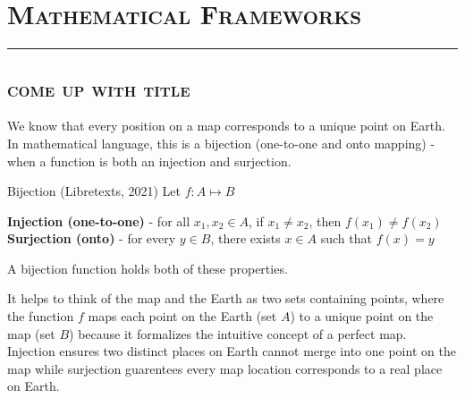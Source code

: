 \section{\textsc{Mathematical Frameworks}}
\hrule height 1pt
\vspace*{5pt}

\subsection{\textsc{come up with title}}
\vspace*{-10pt}
We know that every position on a map corresponds to a unique point on
Earth. In mathematical language, this is a bijection (one-to-one and onto mapping)
 - when a function is both an injection and surjection. 
\begin{definition}{Bijection (Libretexts, 2021)}
    Let $f:A\mapsto B$
    
    \begin{center}
        \textbf{Injection (one-to-one)} - for all $x_1, x_2 \in A$, if $x_1\neq x_2$, then $f(x_1)\neq f(x_2)$\\
        \textbf{Surjection (onto)} - for every $y\in B$, there exists $x\in A$ such that $f(x)=y$\\
    \end{center}

    A bijection function holds both of these properties.
\end{definition}
It helps to think of the map and the Earth as two sets containing points, where the function 
$f$ maps each point on the Earth (set $A$) to a unique point on the map (set $B$) because it 
formalizes the intuitive concept of a perfect map. Injection ensures two distinct places on Earth
cannot merge into one point on the map while surjection guarentees every map location corresponds to
a real place on Earth. 

